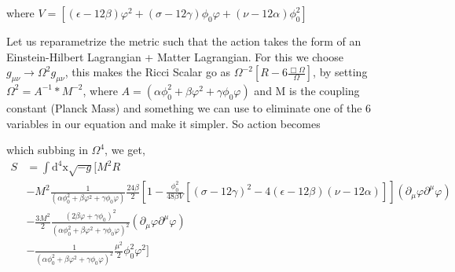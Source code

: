 \documentclass{article}
\begin{document}
where $V = [(\epsilon - 12\beta) \varphi^2 + (\sigma - 12\gamma) \phi_0 \varphi + (\nu - 12\alpha)\phi^2_0]$

Let us reparametrize the metric such that the action takes the form of an Einstein-Hilbert Lagrangian + Matter Lagrangian. For this we choose $g_{\mu\nu} \rightarrow \Omega^2 g_{\mu\nu} $, this makes the  Ricci Scalar go as $\Omega^{-2} [R - 6\frac{\Box\Omega}{\Omega}]$, by setting $\Omega^2 = A^{-1} * M^{-2}$, where $A = (\alpha \phi^2_0 + \beta \varphi^2 + \gamma \phi_0 \varphi)$ and M is the coupling constant (Planck Mass) and something we can use to eliminate one of the 6 variables in our equation and make it simpler. So action becomes

which subbing in $\Omega^4$, we get,
\begin{equation} \label{26}
    \begin{aligned}
        S &= \int \text{d}^4\text{x} \sqrt{-g} [ M^2 R \\
        &- M^2 \frac{1}{(\alpha \phi^2_0 + \beta \varphi^2 + \gamma \phi_0 \varphi)} \frac{24 \beta}{2} \left[ 1 - \frac{\phi_0^2}{48\beta V} [(\sigma - 12\gamma)^2 - 4(\epsilon - 12 \beta)(\nu - 12\alpha) ] \right]  (\partial_\mu \varphi \partial^\mu \varphi)\\ 
        &- \frac{3M^2}{2} \frac{(2\beta \varphi + \gamma \phi_0)^2}{(\alpha \phi^2_0 + \beta \varphi^2 + \gamma \phi_0 \varphi)^2} (\partial_\mu \varphi \partial^\mu \varphi)  \\
        &-  \frac{1}{(\alpha \phi^2_0 + \beta \varphi^2 + \gamma \phi_0 \varphi)^2} \frac{\mu^2}{2} \phi^2_0 \varphi^2 ] 
    \end{aligned}
\end{equation}
\end{document}

